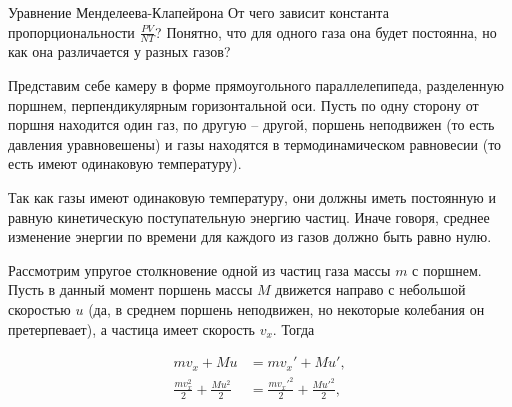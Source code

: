 \documentclass{article}
\begin{document}
	\begin{section}{Уравнение Менделеева-Клапейрона}
		От чего зависит константа пропорциональности $\frac{PV}{NT}$? Понятно, что для одного газа она будет постоянна, но как она различается у разных газов?

		Представим себе камеру в форме прямоугольного параллелепипеда, разделенную поршнем, перпендикулярным горизонтальной оси. Пусть по одну сторону от поршня находится один газ, по другую -- другой, поршень неподвижен (то есть давления уравновешены) и газы находятся в термодинамическом равновесии (то есть имеют одинаковую температуру).


		Так как газы имеют одинаковую температуру, они должны иметь постоянную и равную кинетическую поступательную энергию частиц. Иначе говоря, среднее изменение энергии по времени для каждого из газов должно быть равно нулю.

		Рассмотрим упругое столкновение одной из частиц газа массы $m$ с поршнем. Пусть в данный момент поршень массы $M$ движется направо с небольшой скоростью $u$ (да, в среднем поршень неподвижен, но некоторые колебания он претерпевает), а частица имеет скорость $v_x$. Тогда

		\begin{align*}
			mv_x + Mu &= mv_x' + Mu', \\
			\frac{mv_x^2}{2} + \frac{Mu^2}{2} &= \frac{mv_x'^2}{2} + \frac{Mu'^2}{2},
		\end{align*}


\end{section}
\end{document}
